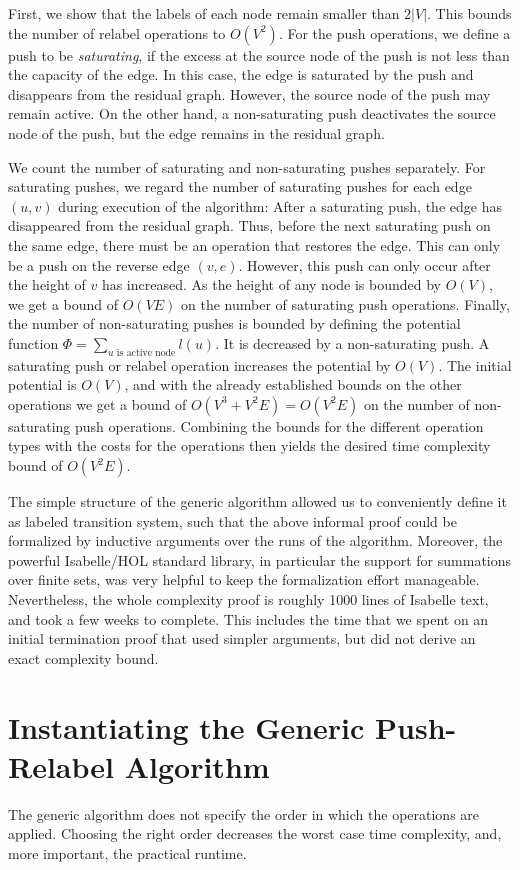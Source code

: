 \documentclass[smallcondensed]{svjour3}     %
\begin{document}
First, we show that the labels of each node remain smaller than $2|V|$. This bounds the number of relabel operations to $O(V^2)$.
For the push operations, we define a push to be \emph{saturating}, if the excess at the source node of the push is not less than the capacity of the edge.
In this case, the edge is saturated by the push and disappears from the residual graph. However, the source node of the push may remain active.
On the other hand, a non-saturating push deactivates the source node of the push, but the edge remains in the residual graph.

We count the number of saturating and non-saturating pushes separately. For saturating pushes, we regard the number of saturating pushes for each edge $(u,v)$ during execution of the algorithm: After a saturating push, the edge has disappeared from the residual graph. Thus, before the next saturating push on the same edge, 
there must be an operation that restores the edge. This can only be a push on the reverse edge $(v,e)$. 
However, this push can only occur after the height of $v$ has increased. As the height of any node is bounded by $O(V)$, we get a bound of $O(VE)$ on the number 
of saturating push operations. 
Finally, the number of non-saturating pushes is bounded by defining the potential function $\Phi = \sum_{\textrm{$u$ is active node}}l(u)$.
It is decreased by a non-saturating push.
A saturating push or relabel operation increases the potential by $O(V)$.
The initial potential is $O(V)$, and with the already established bounds on the other operations we get a bound of
$O(V^3 + V^2E) = O(V^2E)$ on the number of non-saturating push operations. Combining the bounds for the different operation types with the costs for the operations 
then yields the desired time complexity bound of $O(V^2E)$.

The simple structure of the generic algorithm allowed us to conveniently define it as labeled transition system, such that the above informal proof could be formalized
by inductive arguments over the runs of the algorithm.
Moreover, the powerful Isabelle/HOL standard library, in particular the support for summations
over finite sets, was very helpful to keep the formalization effort manageable. 
Nevertheless, the whole complexity proof is roughly 1000 lines of Isabelle text, and took a few weeks to complete.
This includes the time that we spent on an initial termination proof that used simpler arguments, but did not derive an exact complexity bound.

\section{Instantiating the Generic Push-Relabel Algorithm}\label{sec:prpu-inst}
The generic algorithm does not specify the order in which the operations are applied. 
Choosing the right order decreases the worst case time complexity, and, more important, the practical runtime.
\end{document}
